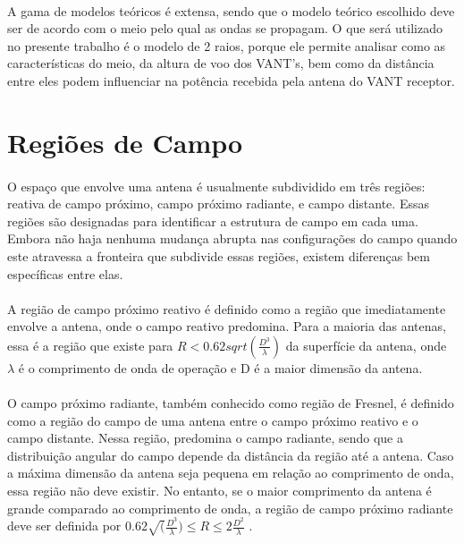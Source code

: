 \paragraph{}A gama de modelos teóricos é extensa, sendo que o modelo teórico escolhido deve ser de acordo com o meio pelo qual as ondas se propagam. O que será utilizado no presente trabalho é o modelo de 2 raios, porque ele permite analisar como as  características do meio, da altura de voo dos VANT's, bem como da distância entre eles podem influenciar na potência recebida pela antena do VANT receptor. 

\section{Regiões de Campo}

\paragraph{}O espaço que envolve uma antena é usualmente subdividido em três regiões: reativa de campo próximo, campo próximo radiante, e campo distante. Essas regiões são designadas para identificar a estrutura de campo em cada uma. Embora  não haja nenhuma mudança abrupta nas configurações do campo quando este atravessa a fronteira que subdivide essas regiões, existem diferenças bem específicas entre elas.

\paragraph{}A região de campo próximo reativo é definido como a região que imediatamente envolve a antena, onde o campo reativo predomina. Para a maioria das antenas, essa é a região que existe para $R < 0.62sqrt(\frac{D^3}{\lambda})$ \citep{balanis} da superfície da antena, onde $\lambda$ é o comprimento de onda de operação e D é a maior dimensão da antena.

\paragraph{}O campo próximo radiante, também conhecido como região de Fresnel, é definido como a região do campo de uma antena entre o campo próximo reativo e o campo distante. Nessa região, predomina o campo radiante, sendo que a distribuição angular do campo depende da distância da região até a antena. Caso a máxima dimensão da antena seja pequena em relação ao comprimento de onda, essa região não deve existir. No entanto, se o maior comprimento da antena é grande comparado ao comprimento de onda, a região de campo próximo radiante deve ser definida por $0.62\sqrt(\frac{D^3}{\lambda})\leq R \leq 2\frac{D^2}{\lambda}$ \citep{balanis}.

